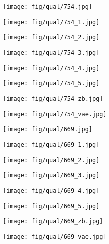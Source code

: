 \documentclass[10pt,twocolumn,letterpaper]{article}
\newcommand{\sz}{0.102}
\newcommand{\szl}{0.067}
\begin{document}
\begin{figure*}[t]
\begin{subfigure}[c]{\sz\linewidth}
\texttt{[image: fig/qual/754.jpg]}
\end{subfigure}
\begin{subfigure}[c]{\sz\linewidth}
\texttt{[image: fig/qual/754\_1.jpg]}
\end{subfigure}
\begin{subfigure}[c]{\sz\linewidth}
\texttt{[image: fig/qual/754\_2.jpg]}
\end{subfigure}
\begin{subfigure}[c]{\sz\linewidth}
\texttt{[image: fig/qual/754\_3.jpg]}
\end{subfigure}
\begin{subfigure}[c]{\sz\linewidth}
\texttt{[image: fig/qual/754\_4.jpg]}
\end{subfigure}
\hspace{3pt}
\begin{subfigure}[c]{\sz\linewidth}
\texttt{[image: fig/qual/754\_5.jpg]}
\end{subfigure}
\begin{subfigure}[c]{\szl\linewidth}
\texttt{[image: fig/qual/754\_zb.jpg]}
\end{subfigure}
\hspace{3pt}
\begin{subfigure}[c]{\szl\linewidth}
\texttt{[image: fig/qual/754\_vae.jpg]}
\end{subfigure}

\begin{subfigure}[c]{\sz\linewidth}
\texttt{[image: fig/qual/669.jpg]}
\end{subfigure}
\begin{subfigure}[c]{\sz\linewidth}
\texttt{[image: fig/qual/669\_1.jpg]}
\end{subfigure}
\begin{subfigure}[c]{\sz\linewidth}
\texttt{[image: fig/qual/669\_2.jpg]}
\end{subfigure}
\begin{subfigure}[c]{\sz\linewidth}
\texttt{[image: fig/qual/669\_3.jpg]}
\end{subfigure}
\begin{subfigure}[c]{\sz\linewidth}
\texttt{[image: fig/qual/669\_4.jpg]}
\end{subfigure}
\hspace{3pt}
\begin{subfigure}[c]{\sz\linewidth}
\texttt{[image: fig/qual/669\_5.jpg]}
\end{subfigure}
\begin{subfigure}[c]{\szl\linewidth}
\texttt{[image: fig/qual/669\_zb.jpg]}
\end{subfigure}
\hspace{3pt}
\begin{subfigure}[c]{\szl\linewidth}
\texttt{[image: fig/qual/669\_vae.jpg]}
\end{subfigure}


\end{figure*}
\end{document}
